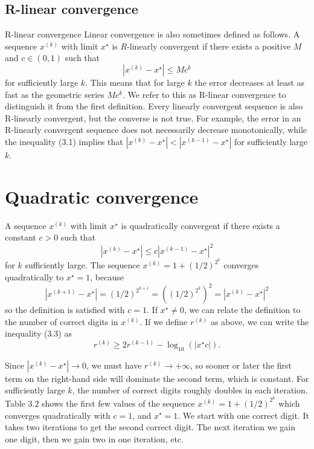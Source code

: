 \subsection{R-linear convergence}

R-linear convergence Linear convergence is also sometimes defined as follows. A sequence $ x^{(k)} $ with limit $ x^{\star} $ is $ R $-linearly convergent if there exists a positive $ M $ and $ c \in(0,1) $ such that
$$
\left|x^{(k)}-x^{\star}\right| \leq M c^{k}
$$
for sufficiently large $ k $. This means that for large $ k $ the error decreases at least as fast as the geometric series $ M c^{k} $. We refer to this as R-linear convergence to distinguish it from the first definition. Every linearly convergent sequence is also R-linearly convergent, but the converse is not true. For example, the error in an R-linearly convergent sequence does not necessarily decrease monotonically, while the inequality (3.1) implies that $ \left|x^{(k)}-x^{\star}\right|<\left|x^{(k-1)}-x^{\star}\right| $ for sufficiently large $ k $.

\section{Quadratic convergence}

A sequence $ x^{(k)} $ with limit $ x^{\star} $ is quadratically convergent if there exists a constant $ c>0 $ such that
$$
\left|x^{(k)}-x^{\star}\right| \leq c\left|x^{(k-1)}-x^{\star}\right|^{2}
$$
for $ k $ sufficiently large. The sequence $ x^{(k)}=1+(1 / 2)^{2^{k}} $ converges quadratically to $ x^{\star}=1 $, because
$$
\left|x^{(k+1)}-x^{\star}\right|=(1 / 2)^{2^{k+1}}=\left((1 / 2)^{2^{k}}\right)^{2}=\left|x^{(k)}-x^{\star}\right|^{2}
$$
so the definition is satisfied with $ c=1 $.
If $ x^{\star} \neq 0 $, we can relate the definition to the number of correct digits in $ x^{(k)} $. If we define $ r^{(k)} $ as above, we can write the inequality (3.3) as
$$
r^{(k)} \geq 2 r^{(k-1)}-\log _{10}\left(\left|x^{\star} c\right|\right) .
$$

Since $ \left|x^{(k)}-x^{\star}\right| \rightarrow 0 $, we must have $ r^{(k)} \rightarrow+\infty $, so sooner or later the first term on the right-hand side will dominate the second term, which is constant. For sufficiently large $ k $, the number of correct digits roughly doubles in each iteration.
Table $ 3.2 $ shows the first few values of the sequence $ x^{(k)}=1+(1 / 2)^{2^{k}} $ which converges quadratically with $ c=1 $, and $ x^{\star}=1 $. We start with one correct digit. It takes two iterations to get the second correct digit. The next iteration we gain one digit, then we gain two in one iteration, etc.

